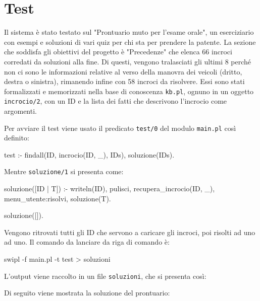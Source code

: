 \chapter{Test}
Il sistema è stato testato sul "Prontuario muto per l'esame orale"\cite{Prontuario}, un eserciziario con esempi e soluzioni di vari quiz per chi sta per prendere la patente. La sezione che soddisfa gli obiettivi del progetto è "Precedenze" che elenca 66 incroci corredati da soluzioni alla fine. Di questi, vengono tralasciati gli ultimi 8 perché non ci sono le informazioni relative al verso della manovra dei veicoli (dritto, destra o sinistra), rimanendo infine con 58 incroci da risolvere. Essi sono stati formalizzati e memorizzati nella base di conoscenza \texttt{kb.pl}, ognuno in un oggetto \texttt{incrocio/2}, con un ID e la lista dei fatti che descrivono l'incrocio come argomenti.

Per avviare il test viene usato il predicato \texttt{test/0} del modulo \texttt{main.pl} così definito:


\begin{verbatimtab}
test :-
	findall(ID, incrocio(ID, _), IDs),
	soluzione(IDs).
\end{verbatimtab}

\noindent
Mentre \texttt{soluzione/1} si presenta come:
\begin{verbatimtab}
soluzione([ID | T]) :-
	writeln(ID),
	pulisci,
	recupera_incrocio(ID, _),
	menu_utente:risolvi,
	soluzione(T).

soluzione([]).
\end{verbatimtab}

Vengono ritrovati tutti gli ID che servono a caricare gli incroci, poi risolti ad uno ad uno. Il comando da lanciare da riga di comando è:
\begin{verbatimtab}
swipl -f main.pl -t test > soluzioni
\end{verbatimtab}

\noindent
L'output viene raccolto in un file \texttt{soluzioni}, che si presenta così:
\scriptsize

\normalsize
Di seguito viene mostrata la soluzione del prontuario:

